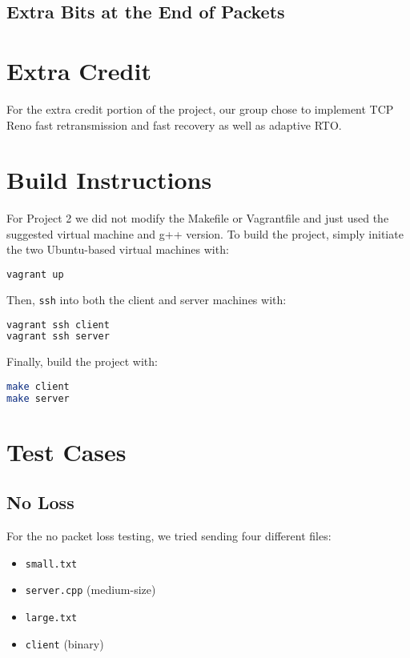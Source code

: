 \documentclass{article}
\begin{document}
\subsection{Extra Bits at the End of Packets}

\section{Extra Credit}

For the extra credit portion of the project, our group chose to implement TCP Reno fast retransmission and fast recovery as well as adaptive RTO.

\section{Build Instructions}

For Project 2 we did not modify the Makefile or Vagrantfile and just used the suggested virtual machine and g++ version. To build the project, simply initiate the two Ubuntu-based virtual machines with:

\begin{lstlisting}[language=bash]
vagrant up
\end{lstlisting} 

\noindent
Then, \texttt{ssh} into both the client and server machines with:

\begin{lstlisting}[language=bash]
vagrant ssh client
vagrant ssh server
\end{lstlisting} 

\noindent
Finally, build the project with:

\begin{lstlisting}[language=bash]
make client
make server
\end{lstlisting}

\section{Test Cases}

\subsection{No Loss}

For the no packet loss testing, we tried sending four different files:

\begin{itemize}
	\item \texttt{small.txt}
	\item \texttt{server.cpp} (medium-size)
	\item \texttt{large.txt}
	\item \texttt{client} (binary)
\end{itemize}
\end{document}
